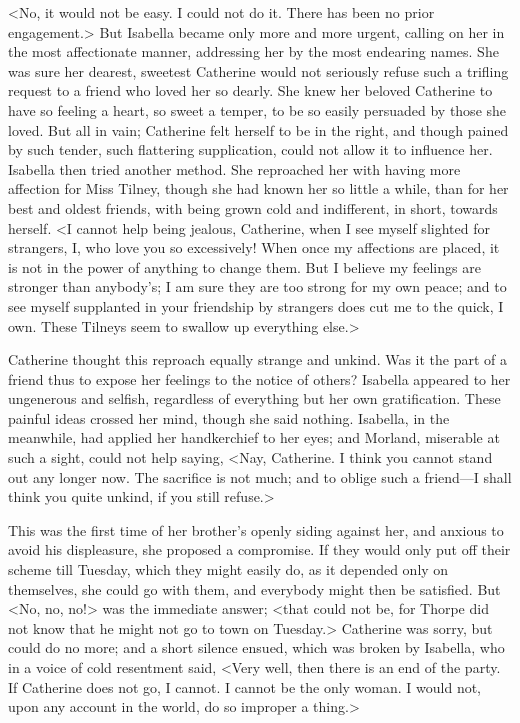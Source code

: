  <No, it would not be easy. I could not do it. There has been no prior engagement.> But Isabella became only more and more urgent, calling on her in the most affectionate manner, addressing her by the most endearing names. She was sure her dearest, sweetest Catherine would not seriously refuse such a trifling request to a friend who loved her so dearly. She knew her beloved Catherine to have so feeling a heart, so sweet a temper, to be so easily persuaded by those she loved. But all in vain; Catherine felt herself to be in the right, and though pained by such tender, such flattering supplication, could not allow it to influence her. Isabella then tried another method. She reproached her with having more affection for Miss Tilney, though she had known her so little a while, than for her best and oldest friends, with being grown cold and indifferent, in short, towards herself. <I cannot help being jealous, Catherine, when I see myself slighted for strangers, I, who love you so excessively! When once my affections are placed, it is not in the power of anything to change them. But I believe my feelings are stronger than anybody's; I am sure they are too strong for my own peace; and to see myself supplanted in your friendship by strangers does cut me to the quick, I own. These Tilneys seem to swallow up everything else.> 

 Catherine thought this reproach equally strange and unkind. Was it the part of a friend thus to expose her feelings to the notice of others? Isabella appeared to her ungenerous and selfish, regardless of everything but her own gratification. These painful ideas crossed her mind, though she said nothing. Isabella, in the meanwhile, had applied her handkerchief to her eyes; and Morland, miserable at such a sight, could not help saying, <Nay, Catherine. I think you cannot stand out any longer now. The sacrifice is not much; and to oblige such a friend—I shall think you quite unkind, if you still refuse.> 

 This was the first time of her brother's openly siding against her, and anxious to avoid his displeasure, she proposed a compromise. If they would only put off their scheme till Tuesday, which they might easily do, as it depended only on themselves, she could go with them, and everybody might then be satisfied. But <No, no, no!> was the immediate answer; <that could not be, for Thorpe did not know that he might not go to town on Tuesday.> Catherine was sorry, but could do no more; and a short silence ensued, which was broken by Isabella, who in a voice of cold resentment said, <Very well, then there is an end of the party. If Catherine does not go, I cannot. I cannot be the only woman. I would not, upon any account in the world, do so improper a thing.> 

